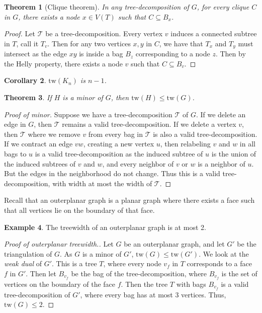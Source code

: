 \documentclass[]{article}
\newcommand{\tree}{\mathcal{T}}
\newcommand{\tw}{\text{tw}}
\newtheorem{theorem}{Theorem}
\newtheorem{corollary}[theorem]{Corollary}
\theoremstyle{definition}
\newtheorem{example}[theorem]{Example}
\numberwithin{theorem}{section}
\numberwithin{equation}{section}
\begin{document}
\begin{theorem}[Clique theorem]\label{thm:clique}
	In any tree-decomposition of $G$, for every clique $C$ in $G$, there exists a node $x \in V(T)$ such that $C \subseteq B_x$. 
\end{theorem}

\begin{proof}
	Let $\tree$ be a tree-decomposition. Every vertex $v$ induces a connected subtree in $T$, call it $T_v$. Then for any two vertices $x, y$ in $C$, we have that $T_x$ and $T_y$ must intersect as the edge $xy$ is inside a bag $B_z$ corresponding to a node $z$. Then by the Helly property, there exists a node $v$ such that $C \subseteq B_v$.
\end{proof}

\begin{corollary}\label{cor:complete_tw}
	$\tw(K_n)$ is $n-1$. 
\end{corollary}

\begin{theorem}\label{thm:tw_minor_closure}
	If $H$ is a minor of $G$, then $\tw(H) \leq \tw(G)$. 
\end{theorem}
\begin{proof}[Proof of minor]
	Suppose we have a tree-decomposition $\tree$ of $G$. If we delete an edge in $G$, then $\tree$ remains a valid tree-decomposition. If we delete a vertex $v$, then $\tree$ where we remove $v$ from every bag in $\tree$ is also a valid tree-decomposition. If we contract an edge $vw$, creating a new vertex $u$, then relabeling $v$ and $w$ in all bags to $u$ is a valid tree-decomposition as the induced subtree of $u$ is the union of the induced subtrees of $v$ and $w$, and every neighbor of $v$ or $w$ is a neighbor of $u$. But the edges in the neighborhood do not change. Thus this is a valid tree-decomposition, with width at most the width of $\tree$.
\end{proof}

Recall that an outerplanar graph is a planar graph where there exists a face such that all vertices lie on the boundary of that face. 
\begin{example}\label{ex:tw_outerplanar}
	The treewidth of an outerplanar graph is at most 2.
\end{example}
\begin{proof}[Proof of outerplanar treewidth.]
	Let $G$ be an outerplanar graph, and let $G'$ be the triangulation of $G$. As $G$ is a minor of $G'$, $\tw(G) \leq \tw(G')$. We look at the \textit{weak dual} of $G'$. This is a tree $T$, where every node $v_f$ in $T$ corresponds to a face $f$ in $G'$. Then let $B_{v_f}$ be the bag of the tree-decomposition, where $B_{v_f}$ is the set of vertices on the boundary of the face $f$. Then the tree $T$ with bags $B_{v_f}$ is a valid tree-decomposition of $G'$, where every bag has at most 3 vertices. Thus, $\tw(G) \leq 2$. 
\end{proof}
\end{document}
